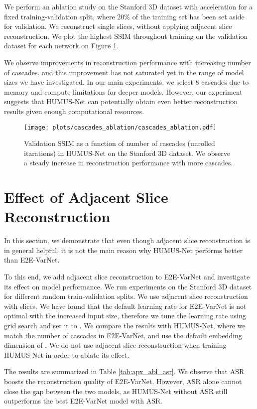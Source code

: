 We perform an ablation study on the Stanford 3D dataset with  acceleration for a fixed training-validation split, where 20\% of the training set has been set aside for validation. We reconstruct single slices, without applying adjacent slice reconstruction. We plot the highest SSIM throughout training on the validation dataset for each network on Figure \ref{fig:apx_casc_abl}. 

We observe improvements in reconstruction performance with increasing number of cascades, and this improvement has not saturated yet in the range of model sizes we have investigated. In our main experiments, we select 8 cascades due to memory and compute limitations for deeper models. However, our experiment suggests that HUMUS-Net can potentially obtain even better reconstruction results given enough computational resources.

\begin{figure}[t!]
	\centering
	\hspace{-1cm}
	\texttt{[image: plots/cascades\_ablation/cascades\_ablation.pdf]}	
	\caption{Validation SSIM as a function of number of cascades (unrolled itarations) in HUMUS-Net on the Stanford 3D dataset. We observe a steady increase in reconstruction performance with more cascades. \label{fig:apx_casc_abl}}
\end{figure}

\section{Effect of Adjacent Slice Reconstruction\label{sec:apx_asr}}
In this section, we demonstrate that even though adjacent slice reconstruction is in general helpful, it is not the main reason why HUMUS-Net performs better than E2E-VarNet.

To this end, we add  adjacent slice reconstruction to E2E-VarNet and investigate its effect on model performance. We run experiments on the Stanford 3D dataset for  different random train-validation splits. We use adjacent slice reconstruction with  slices. We have found that the default learning rate for E2E-VarNet is not optimal with the increased input size, therefore we tune the learning rate using grid search and set it to . We compare the results with HUMUS-Net, where we match the number of cascades in E2E-VarNet, and use the default embedding dimension of . We do not use adjacent slice reconstruction when training HUMUS-Net in order to ablate its effect.

The results are summarized in Table \ref{tab:apx_abl_asr}. We observe that ASR boosts the reconstruction quality of E2E-VarNet. However, ASR alone cannot close the gap between the two models, as HUMUS-Net without ASR still outperforms the best E2E-VarNet model with ASR.

